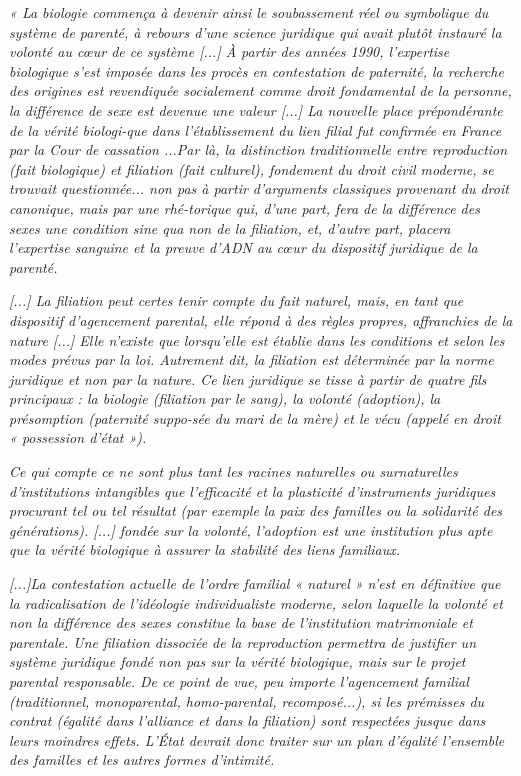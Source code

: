   \begin{displayquote}
\emph{« La biologie commença à devenir ainsi le soubassement réel ou symbolique du système de parenté, à rebours d'une science juridique qui avait plutôt instauré la volonté au cœur de ce système [...] À partir des années 1990, l'expertise biologique  s'est imposée dans les procès en contestation de paternité, la recherche des origines est revendiquée socialement comme droit fondamental de la personne, la différence de sexe est devenue une valeur [...] La nouvelle place prépondérante de la vérité biologi-que dans l'établissement du lien filial fut confirmée en France par la Cour de cassation  ...Par là, la distinction traditionnelle entre reproduction (fait biologique) et filiation (fait culturel), fondement du droit civil moderne, se trouvait questionnée... non pas à partir d'arguments classiques provenant du droit canonique, mais par une rhé-torique qui, d'une part, fera de la différence des sexes une condition sine qua non de la filiation, et, d'autre part, placera l'expertise sanguine et la preuve d'ADN au cœur du dispositif juridique de la parenté.}

\emph{[...] La filiation peut certes tenir compte du fait naturel, mais, en tant que dispositif d'agencement parental, elle répond à des règles propres, affranchies de la nature [...] Elle n'existe que lorsqu'elle est établie dans les conditions et selon les modes prévus par la loi. Autrement dit, la filiation est déterminée par la norme juridique et non par la nature. Ce lien juridique se tisse à partir de quatre fils principaux : la biologie (filiation par le sang), la volonté (adoption), la présomption (paternité suppo-sée du mari de la mère) et le vécu (appelé en droit « possession d'état »).}

\emph{Ce qui compte ce ne sont plus tant les racines naturelles ou surnaturelles d'institutions intangibles que l'efficacité et la plasticité d'instruments juridiques procurant tel ou tel résultat (par exemple la paix des familles ou la solidarité des générations).  [...] fondée sur la volonté, l'adoption est une institution plus apte que la vérité biologique à assurer la stabilité des liens familiaux.}

 \emph{[...]La contestation actuelle de l'ordre familial « naturel » n'est en définitive que la radicalisation de l'idéologie individualiste moderne, selon laquelle la volonté et non la différence des sexes constitue la base de l'institution matrimoniale et parentale. Une filiation dissociée de la reproduction permettra de justifier un système juridique fondé non pas sur la vérité biologique, mais sur le projet parental responsable. De ce point de vue, peu importe l'agencement familial (traditionnel, monoparental, homo-parental, recomposé...), si les prémisses du contrat (égalité dans l'alliance et dans la filiation) sont respectées jusque dans leurs moindres effets. L'État devrait donc traiter sur un plan d'égalité l'ensemble des familles et les autres formes d'intimité.}
 

\end{displayquote}
